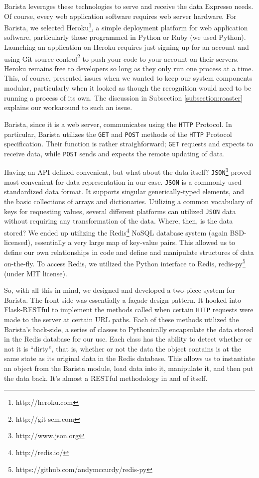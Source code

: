 \documentclass{acm_proc_article-sp}
\begin{document}
Barista leverages these technologies to serve and receive the data Expresso needs. Of course, every web application software requires web server hardware. For Barista, we selected Heroku\footnote{http://heroku.com}, a simple deployment platform for web application software, particularly those programmed in Python or Ruby (we used Python). Launching an application on Heroku requires just signing up for an account and using Git source control\footnote{http://git-scm.com} to push your code to your account on their servers. Heroku remains free to developers so long as they only run one process at a time. This, of course, presented issues when we wanted to keep our system components modular, particularly when it looked as though the recognition would need to be running a process of its own. The discussion in Subsection \ref{subsection:roaster} explains our workaround to such an issue.

Barista, since it is a web server, communicates using the \texttt{HTTP} Protocol. In particular, Barista utilizes the \texttt{GET} and \texttt{POST} methods of the \texttt{HTTP} Protocol specification. Their function is rather straighforward; \texttt{GET} requests and expects to receive data, while \texttt{POST} sends and expects the remote updating of data. 

Having an API defined convenient, but what about the data itself? \texttt{JSON}\footnote{http://www.json.org} proved most convenient for data representation in our case. \texttt{JSON} is a commonly-used standardized data format. It supports singular generically-typed elements, and the basic collections of arrays and dictionaries. Utilizing a common vocabulary of keys for requesting values, several different platforms can utilized \texttt{JSON} data without requiring any transformation of the data. Where, then, is the data stored? We ended up utilizing the Redis\footnote{http://redis.io/} NoSQL database system (again BSD-licensed), essentially a very large map of key-value pairs. This allowed us to define our own relationships in code and define and manipulate structures of data on-the-fly. To access Redis, we utilized the Python interface to Redis, redis-py\footnote{https://github.com/andymccurdy/redis-py} (under MIT license).

So, with all this in mind, we designed and developed a two-piece system for Barista. The front-side was essentially a fa\c{c}ade design pattern. It hooked into Flask-RESTful to implement the methods called when certain \texttt{HTTP} requests were made to the server at certain URL paths. Each of these methods utilized the Barista's back-side, a series of classes to Pythonically encapsulate the data stored in the Redis database for our use. Each class has the ability to detect whether or not it is ``dirty'', that is, whether or not the data the object contains is at the same state as its original data in the Redis database. This allows us to instantiate an object from the Barista module, load data into it, manipulate it, and then put the data back. It's almost a RESTful methodology in and of itself.
\end{document}
